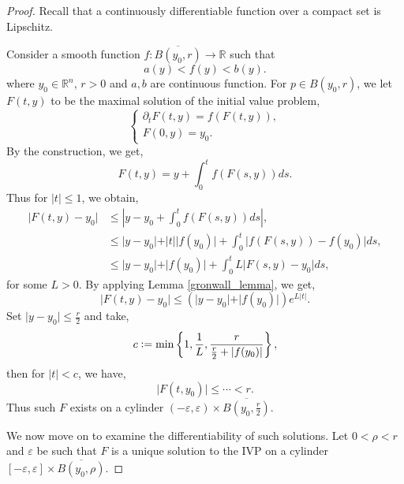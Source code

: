\documentclass[8pt]{article}
\newcommand{\defeq}{\vcentcolon=}
\newcommand{\R}[0]{\mathbb{R}}
\begin{document}
\setcounter{claim}{0}
\begin{proof}
Recall that a continuously differentiable function over a compact set is Lipschitz.
\par Consider a smooth function $f:\overline{B(y_0,r)}\to\R$ such that 
\begin{equation*}
  a(y)<f(y)<b(y).
\end{equation*}
where $y_0\in\R^n$, $r>0$ and $a,b$ are continuous function.  For $p\in B(y_0,r)$, we let $F(t,y)$ to be the maximal solution of the initial value problem,
\begin{equation*}
  \begin{cases}
    \partial_t F(t,y) = f(F(t,y)),\\
    F(0,y) = y_0.
  \end{cases}
  \tag{P1}
\end{equation*}
By the construction, we get,
\begin{equation*}
  F(t,y) = y+\int_0^t f(F(s,y))ds.
\end{equation*}
Thus for $\vert t\vert\leq 1$, we obtain,
\begin{align*}
  \vert F(t,y)-y_0\vert & \leq \left\vert y -y_0+\int_0^t f(F(s,y))ds\right\vert,\\
  & \leq \vert y - y_0\vert +\vert t\vert\vert f(y_0)\vert +\int_0^t\vert f(F(s,y))-f(y_0)\vert ds,\\
  & \leq \vert y-y_0\vert +\vert f(y_0)\vert +\int_0^t L\vert F(s,y)-y_0\vert ds,
\end{align*}
for some $L>0$. By applying Lemma \ref{gronwall_lemma}, we get,
\begin{equation*}
  \vert F(t,y)-y_0\vert \leq (\vert y-y_0\vert+\vert f(y_0)\vert)e^{L\vert t\vert}.
\end{equation*}
Set $\vert y -y_0\vert \leq {\frac r 2}$ and take,
\begin{equation*}
  c\defeq \min\left\{1,{\frac 1 L},{\frac {r} {{\frac r 2}+\vert f(y_0)\vert}}\right\},
\end{equation*}
then for $\vert t\vert<c$, we have,
\begin{equation*}
  \vert F(t,y_0)\vert\leq \cdots <r.
\end{equation*}
Thus such $F$ exists on a cylinder $(-\varepsilon,\varepsilon)\times\overline{B\left(y_0,{\frac r 2}\right)}$.
\par We now move on to examine the differentiability of such solutions. Let $0<\rho<r$ and $\varepsilon$ be such that $F$ is a unique solution to the IVP on a cylinder $[-\varepsilon,\varepsilon]\times \overline{B(y_0,\rho)}$.

\end{proof}
\end{document}
